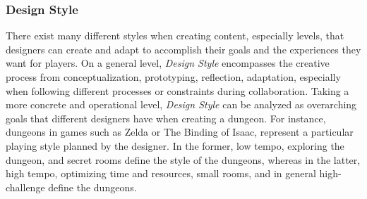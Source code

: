 \subsubsection{Design Style} \label{sec:designStyle}




There exist many different styles when creating content, especially levels, that designers can create and adapt to accomplish their goals and the experiences they want for players. On a general level, \emph{Design Style} encompasses the creative process from conceptualization, prototyping, reflection, adaptation, especially when following different processes or constraints during collaboration. Taking a more concrete and operational level, \emph{Design Style} can be analyzed as overarching goals that different designers have when creating a dungeon. For instance, dungeons in games such as Zelda\cite{p10tloz} or The Binding of Isaac\cite{p10mcmillen_binding_2011}, represent a particular playing style planned by the designer. In the former, low tempo, exploring the dungeon, and secret rooms define the style of the dungeons, whereas in the latter, high tempo, optimizing time and resources, small rooms, and in general high-challenge define the dungeons. 

